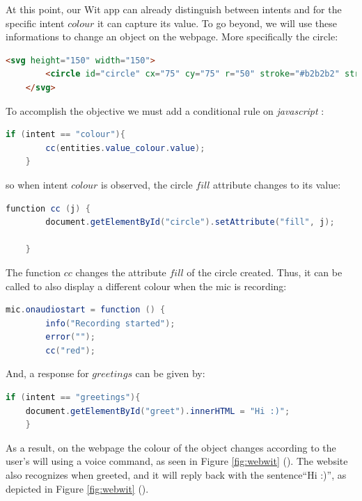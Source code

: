 \documentclass[twoside,11pt]{article}
\begin{document}
At this point, our Wit app can already distinguish between intents and for the specific intent $colour$ it can capture its value.
To go beyond, we will use these informations to change an object on the webpage.
More specifically the circle:
\begin{lstlisting}[language=html]
	<svg height="150" width="150">
		<circle id="circle" cx="75" cy="75" r="50" stroke="#b2b2b2" stroke-width="4"/>
	</svg> 
\end{lstlisting}

To accomplish the objective we must add a conditional rule on \emph{javascript} \citep{flanagan2006javascript}: 
\begin{lstlisting}[language=java]
	if (intent == "colour"){
		cc(entities.value_colour.value);
 	}
\end{lstlisting}
so when intent $colour$ is observed, the circle $fill$ attribute changes to its value:
\begin{lstlisting}[language=java]
	function cc (j) {
		document.getElementById("circle").setAttribute("fill", j);

	}
\end{lstlisting}

The function $cc$ changes the attribute $fill$ of the circle created.
Thus, it can be called to also display a different colour when the mic is recording:
\begin{lstlisting}[language=java]
	mic.onaudiostart = function () {
		info("Recording started");
        error("");
        cc("red");
\end{lstlisting}

And, a response for $greetings$ can be given by:
\begin{lstlisting}[language=java]
	if (intent == "greetings"){
	document.getElementById("greet").innerHTML = "Hi :)";
	}
\end{lstlisting}

As a result, on the webpage the colour of the object changes according to the user's will using a voice command, as seen in Figure \ref{fig:webwit} ().
The website also recognizes when greeted, and it will reply back with the sentence``Hi :)'', as depicted in Figure \ref{fig:webwit} ().
\end{document}
